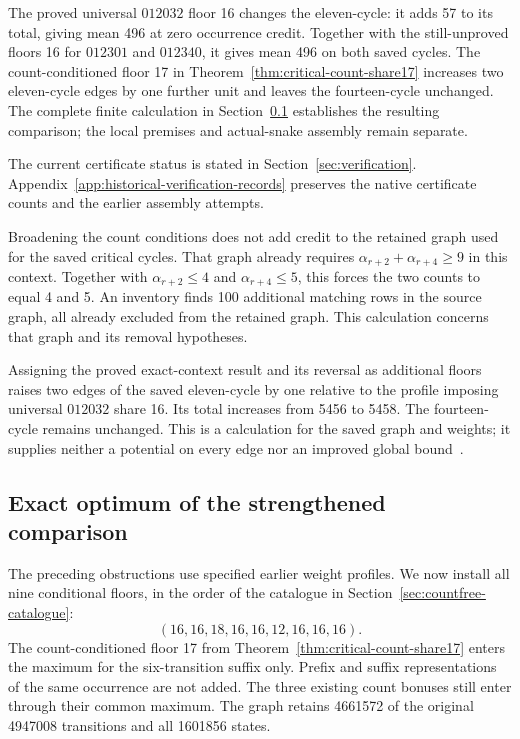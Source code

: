 \documentclass[11pt,a4paper]{article}
\theoremstyle{definition}
\theoremstyle{remark}
\begin{document}
The proved universal $012032$ floor 16 changes the eleven-cycle: it adds
57 to its total, giving mean 496 at zero occurrence credit. Together with
the still-unproved floors 16 for $012301$ and $012340$, it gives mean 496
on both saved cycles. The count-conditioned floor 17 in
Theorem~\ref{thm:critical-count-share17} increases two eleven-cycle edges
by one further unit and leaves the fourteen-cycle unchanged. The complete
finite calculation in Section~\ref{sec:range156} establishes the resulting
comparison; the local premises and actual-snake assembly remain separate.

The current certificate status is stated in Section~\ref{sec:verification}.
Appendix~\ref{app:historical-verification-records} preserves the native
certificate counts and the earlier assembly attempts.

Broadening the count conditions does not add credit to the retained graph
used for the saved critical cycles. That graph already requires
$\alpha_{r+2}+\alpha_{r+4}\ge9$ in this context. Together with
$\alpha_{r+2}\le4$ and $\alpha_{r+4}\le5$, this forces the two counts
to equal 4 and 5. An inventory finds 100 additional matching rows in the
source graph, all already excluded from the retained graph. This
calculation concerns that graph and its removal hypotheses.

Assigning the proved exact-context result and its reversal as additional
floors raises two edges of the saved eleven-cycle by one relative to the
profile imposing universal $012032$ share 16. Its total increases from
5456 to 5458. The fourteen-cycle remains unchanged. This is a calculation
for the saved graph and weights; it supplies neither a potential on every
edge nor an improved global bound~\cite{critical153archive,share155archive}.


\subsection{Exact optimum of the strengthened comparison}\label{sec:range156}
The preceding obstructions use specified earlier weight profiles. We now
install all nine conditional floors, in the order of the catalogue in
Section~\ref{sec:countfree-catalogue}:
\[
(16,16,18,16,16,12,16,16,16).
\]
The count-conditioned floor 17 from
Theorem~\ref{thm:critical-count-share17} enters the maximum for the
six-transition suffix only. Prefix and suffix representations of the same
occurrence are not added. The three existing count bonuses still enter
through their common maximum. The graph retains 4661572 of the original
4947008 transitions and all 1601856 states.
\end{document}
